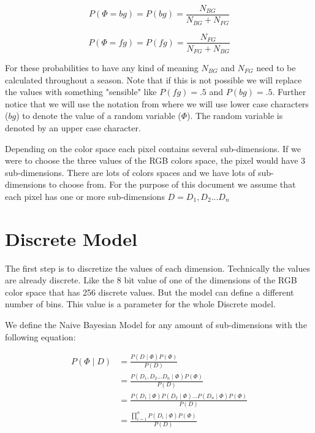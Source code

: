 \documentclass[a4paper,12pt]{report}
\begin{document}
\begin{equation}
P(\Phi= bg) = P(bg) = \frac{N_{BG}}{N_{BG}+N_{FG}}
\end{equation}

\begin{equation}
P(\Phi= fg) = P(fg) = \frac{N_{FG}}{N_{FG}+N_{BG}}
\end{equation}

For these probabilities to have any kind of meaning $N_{BG}$ and $N_{FG}$ need
to be calculated throughout a season. Note that if this is not possible we will
replace the values with something "sensible" like $P(fg)=.5$ and $P(bg)=.5$.
Further notice that we will use the notation from
 where we will use
lower case characters ($bg$) to denote the value of a random variable ($\Phi$).
The random variable is denoted by an upper case character.

Depending on the color space each pixel contains several sub-dimensions. If we
were to choose the three values of the RGB colors space, the pixel would have 3
sub-dimensions. There are lots of colors spaces and we have lots of
sub-dimensions to choose from. For the purpose of this document we assume that
each pixel has one or more sub-dimensions $D={D_1, D_2... D_n}$

\section{Discrete Model}
The first step is to discretize the values of each dimension. Technically the
values are already discrete. Like the 8 bit value of one of the dimensions of
the RGB color space that has 256 discrete values. But the model
can define a different number of bins. This value is a parameter for the
whole Discrete model.

We define the Naive Bayesian Model for any amount of sub-dimensions with the
following equation:

\begin{align}
P(\Phi \mid D)
    &= \frac{P(D \mid \Phi) P(\Phi)}
            {P(D)} \\
    &= \frac{P(D_1, D_2...D_n \mid \Phi) P(\Phi)}
            {P(D)} \\
    &= \frac{P(D_1 \mid \Phi)
             P(D_2 \mid \Phi) ...
             P(D_n \mid \Phi) P(\Phi)}
            {P(D)} \\
    &= \frac{\prod_{i=1}^n{P(D_i \mid \Phi)} P(\Phi)}
            {P(D)} \\
\end{align}
\end{document}
